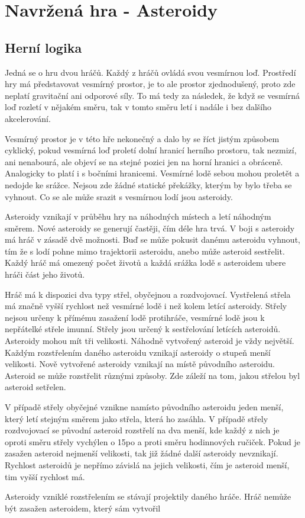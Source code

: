 \chapter{Navržená hra - Asteroidy}

\section{Herní logika}
Jedná se o hru dvou hráčů. 
Každý z hráčů ovládá svou vesmírnou loď.
Prostředí hry má představovat vesmírný prostor, je to ale prostor zjednodušený, proto zde neplatí gravitační ani odporové síly.
To má tedy za následek, že když se vesmírná loď rozletí v nějakém směru, tak v tomto směru letí i nadále i bez dalšího akcelerování.
\par
\label{HraniceProsotru}
Vesmírný prostor je v této hře nekonečný a dalo by se říct jistým způsobem cyklický, pokud vesmírná loď proletí dolní hranicí herního prostoru, tak nezmizí, ani nenabourá, ale objeví se na stejné pozici jen na horní hranici a obráceně. Analogicky to platí i s bočními hranicemi.
Vesmírné lodě sebou mohou proletět a nedojde ke srážce.
Nejsou zde žádné statické překážky, kterým by bylo třeba se vyhnout. Co se ale může srazit s vesmírnou lodí jsou asteroidy.    
\par
Asteroidy vznikají v průběhu hry na náhodných místech a letí náhodným směrem. Nové asteroidy se generují častěji, čím déle hra trvá.
V boji s asteroidy má hráč v zásadě dvě možnosti. Buď se může pokusit danému asteroidu vyhnout, tím že s lodí pohne mimo trajektorii asteroidu, anebo může asteroid sestřelit.
Každý hráč má omezený počet životů a každá srážka lodě s asteroidem ubere hráči část jeho životů.
\par
Hráč má k dispozici dva typy střel, obyčejnou a rozdvojovací. Vystřelená střela má značně vyšší rychlost než vesmírné lodě i než kolem letící asteroidy.
Střely nejsou určeny k přímému zasažení lodě protihráče, vesmírné lodě jsou k nepřátelké střele imunní.
Střely jsou určený k sestřelování letících asteroidů. Asteroidy mohou mít tři velikosti. Náhodně vytvořený asteroid je vždy největší. Každým rozstřelením daného asteroidu vznikají asteroidy o stupeň menší velikosti.
Nově vytvořené asteroidy vznikají na místě původního asteroidu. Asteroid se může rozstřelit různými způsoby. Zde záleží na tom, jakou střelou byl asteroid setřelen. 
\par
V případě střely obyčejné vznikne namísto původního asteroidu jeden menší, který letí stejným směrem jako střela, která ho zasáhla.
V případě střely rozdvojovací se původní asteroid rozstřelí na dva menší, kde každý z nich je oproti směru střely vychýlen o 15\textdegree po a proti směru hodinnových ručiček.
Pokud je zasažen asteroid nejmenší velikosti, tak již žádné další asteroidy nevznikají. 
Rychlost asteroidů je nepřímo závislá na jejich velikosti, čím je asteroid menší, tim vyšší rychlost má.
\par
Asteroidy vzniklé rozstřelením se stávají projektily daného hráče. Hráč nemůže být zasažen asteroidem, který sám vytvořil


